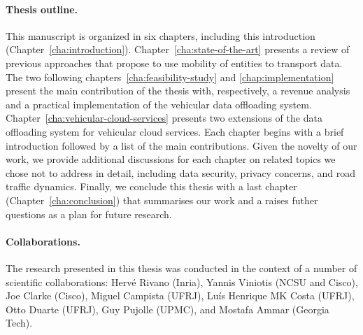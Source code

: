 \paragraph{Thesis outline.}
This manuscript is organized in six chapters, including this introduction (Chapter~\ref{cha:introduction}). Chapter~\ref{cha:state-of-the-art} presents a review of previous approaches that propose to use mobility of entities to transport data. The two following chapters~\ref{cha:feasibility-study} and \ref{chap:implementation} present the main contribution of the thesis with, respectively, a revenue analysis and a practical implementation of the vehicular data offloading system. Chapter~\ref{cha:vehicular-cloud-services} presents two extensions of the data offloading system for vehicular cloud services. Each chapter begins with a brief introduction followed by a list of the main contributions. Given the novelty of our work, we provide additional discussions for each chapter on related topics we chose not to address in detail, including data security, privacy concerns, and road traffic dynamics. Finally, we conclude this thesis with a last chapter (Chapter~\ref{cha:conclusion}) that summarises our work and a raises futher questions as a plan for future research. 

\paragraph{Collaborations.} 
The research presented in this thesis was conducted in the context of a number of scientific collaborations: Hervé Rivano (Inria), Yannis Viniotis (NCSU and Cisco), Joe Clarke (Cisco), Miguel Campista (UFRJ), Luís Henrique MK Costa (UFRJ), Otto Duarte (UFRJ), Guy Pujolle (UPMC), and Mostafa Ammar (Georgia Tech).